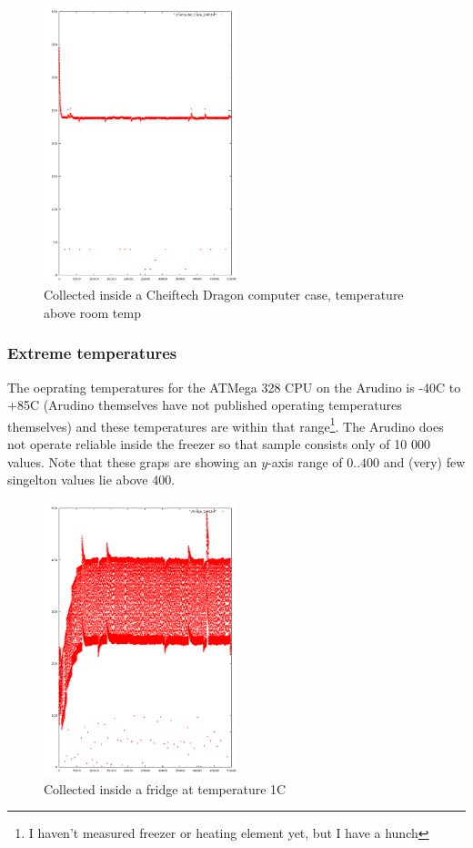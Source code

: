 \documentclass[10pt,a4paper]{article}
\begin{document}
\begin{figure}[H!]
  \caption{Collected inside a Cheiftech Dragon computer case, temperature above room temp}
  \centering
  \includegraphics[width=0.5\textwidth]{img/ComputerCase50.png}
\end{figure}


\subsubsection{Extreme temperatures}

The oeprating temperatures for the ATMega 328 CPU on the Arudino is -40C to +85C \cite{atmegads} (Arudino themselves have not published operating temperatures themselves) and these temperatures are within that range\footnote{I haven't measured freezer or heating element yet, but I have a hunch}. The Arudino does not operate reliable inside the freezer so that sample consists only of 10 000 values. Note that these graps are showing an $y$-axis range of $0..400$ and (very) few singelton values lie above 400. 

\begin{figure}[H!]
  \caption{Collected inside a fridge at temperature 1C} %
  \centering
  \includegraphics[width=0.5\textwidth]{img/Fridge50k.png}
\end{figure}
\end{document}
